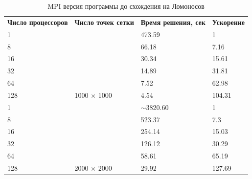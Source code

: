 \documentclass[12pt, a4paper]{article}
\begin{document}
        \begin{table}[H]
            \centering
            \caption{MPI версия программы до схождения на Ломоносов}
            \label{tab:lom_mpi_full}
            \begin{tabular}{llll}
            \rowcolor[HTML]{C0C0C0}
            \textbf{Число процессоров} & \textbf{Число точек сетки}                   & \textbf{Время решения, сек} & \textbf{Ускорение} \\
            \rowcolor[HTML]{EFEFEF}
            1                 &                                      & 473.59             & 1         \\
            8                 &                                      & 66.18              & 7.16      \\
            16                &                                      & 30.34              & 15.61     \\
            32                &                                      & 14.89              & 31.81     \\
            64                &                                      & 7.52               & 62.98     \\
            128               & \multirow{-5}{*}{1000 $\times$ 1000} & 4.54               & 104.31    \\
            \rowcolor[HTML]{EFEFEF}
            1                 &                                      & $\sim$3820.60      & 1         \\
            8                 &                                      & 523.37             & 7.3       \\
            16                &                                      & 254.14             & 15.03     \\
            32                &                                      & 126.12             & 30.29     \\
            64                &                                      & 58.61              & 65.19     \\
            128               & \multirow{-5}{*}{2000 $\times$ 2000} & 29.92              & 127.69
            \end{tabular}
        \end{table}
\end{document}
